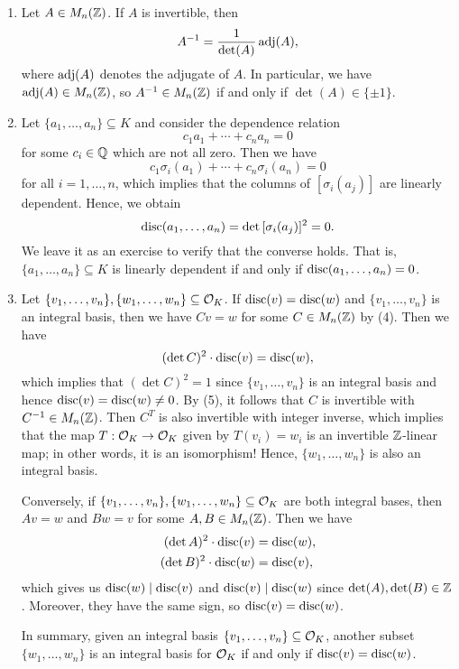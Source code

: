 \begin{enumerate}[(1)]
    \item Let $A \in M_n(\mathbb{Z})$. If $A$ is invertible, then 
    \[ A^{-1} = \frac{1}{\det(A)} \operatorname{adj}(A), \] 
    where $\operatorname{adj}(A)$ denotes the adjugate of $A$. In particular, we have 
    $\operatorname{adj}(A) \in M_n(\mathbb{Z})$, so $A^{-1} \in M_n(\mathbb{Z})$ if and only if 
    $\det(A) \in \{\pm1\}$. 

    \item Let $\{a_1, \dots, a_n\} \subseteq K$ and consider the dependence 
    relation 
    \[ c_1 a_1 + \cdots + c_n a_n = 0 \] 
    for some $c_i \in \mathbb{Q}$ which are not all zero. Then we have 
    \[ c_1 \sigma_i(a_1) + \cdots + c_n \sigma_i(a_n) = 0 \] 
    for all $i = 1, \dots, n$, which implies that the columns of 
    $[\sigma_i(a_j)]$ are linearly dependent. Hence, we obtain 
    \[ \operatorname{disc}(a_1, \dots, a_n) = \det\,[\sigma_i(a_j)]^2 = 0. \] 
    We leave it as an exercise to verify that the converse holds. 
    That is, $\{a_1, \dots, a_n\} \subseteq K$ is linearly dependent 
    if and only if $\operatorname{disc}(a_1, \dots, a_n) = 0$. 
    
    \item Let $\{v_1, \dots, v_n\}, \{w_1, \dots, w_n\} \subseteq {\cal O}_K$. 
    If $\operatorname{disc}(v) = \operatorname{disc}(w)$ and $\{v_1, \dots, v_n\}$ is an integral 
    basis, then we have $Cv = w$ for some $C \in M_n(\mathbb{Z})$ by (4). Then we have 
    \[ (\det C)^2 \cdot \operatorname{disc}(v) = \operatorname{disc}(w), \] 
    which implies that $(\det C)^2 = 1$ since $\{v_1, \dots, v_n\}$ 
    is an integral basis and hence $\operatorname{disc}(v) = \operatorname{disc}(w) \neq 0$. By (5),
    it follows that $C$ is invertible with $C^{-1} \in M_n(\mathbb{Z})$. 
    Then $C^T$ is also invertible with integer inverse, which implies that 
    the map $T : {\cal O}_K \to {\cal O}_K$ given by $T(v_i) = w_i$ is 
    an invertible $\mathbb{Z}$-linear map; in other words, it is an isomorphism! 
    Hence, $\{w_1, \dots, w_n\}$ is also an integral basis. 

    Conversely, if $\{v_1, \dots, v_n\}, \{w_1, \dots, w_n\} \subseteq 
    {\cal O}_K$ are both integral bases, then $Av = w$ and $Bw = v$ for some 
    $A, B \in M_n(\mathbb{Z})$. Then we have 
    \begin{align*}
        (\det A)^2 \cdot \operatorname{disc}(v) &= \operatorname{disc}(w), \\ 
        (\det B)^2 \cdot \operatorname{disc}(w) &= \operatorname{disc}(v), 
    \end{align*}
    which gives us $\operatorname{disc}(w) \mid \operatorname{disc}(v)$ and $\operatorname{disc}(v) \mid \operatorname{disc}(w)$ 
    since $\det(A), \det(B) \in \mathbb{Z}$. Moreover, they have the same sign, 
    so $\operatorname{disc}(v) = \operatorname{disc}(w)$. 

    In summary, given an integral basis $\{v_1, \dots, v_n\} \subseteq 
    {\cal O}_K$, another subset $\{w_1, \dots, w_n\}$ is an integral 
    basis for ${\cal O}_K$ if and only if $\operatorname{disc}(v) = \operatorname{disc}(w)$. 
\end{enumerate}

